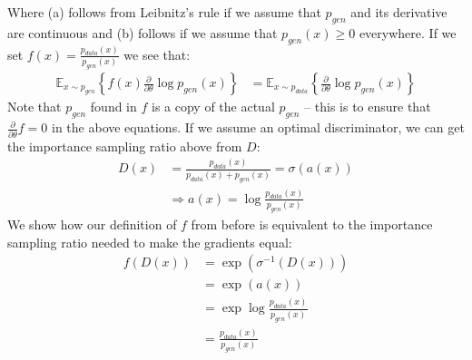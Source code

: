 \documentclass[paper=a4, fontsize=11pt]{scrartcl} %
\numberwithin{equation}{section} %
\numberwithin{figure}{section} %
\numberwithin{table}{section} %
\newcommand{\Ex}[2]{\mathbb{E}_{#1}\left\{#2\right\}}
\newcommand{\dP}[2]{\frac{\partial #1}{\partial #2}}
\begin{document}
Where (a) follows from Leibnitz's rule if we assume that $p_{gen}$ and its derivative are continuous and (b) follows if we assume that $p_{gen}(x) \ge 0$ everywhere. If we set $f(x)=\frac{p_{data}(x)}{p_{gen}(x)}$ we see that:
\begin{align*}
\Ex{x\sim p_{gen}}{f(x) \dP{}{\theta}\log p_{gen}(x)} &= \Ex{x\sim p_{data}}{\dP{}{\theta}\log p_{gen}(x)}
\end{align*}
Note that $p_{gen}$ found in $f$ is a copy of the actual $p_{gen}$ -- this is to ensure that $\dP{}{\theta}f = 0$ in the above equations. If we assume an optimal discriminator, we can get the importance sampling ratio above from $D$:
\begin{align*}
D(x) &= \frac{p_{data}(x)}{p_{data}(x)+p_{gen}(x)} = \sigma(a(x))\\
&\Rightarrow a(x) = \log\frac{p_{data}(x)}{p_{gen}(x)}
\end{align*}
We show how our definition of $f$ from before is equivalent to the importance sampling ratio needed to make the gradients equal:
\begin{align*}
f(D(x)) &= \exp( \sigma^{-1}(D(x)) ) \\
&= \exp( a(x) ) \\
&= \exp\log\frac{p_{data}(x)}{p_{gen}(x)}\\
&= \frac{p_{data}(x)}{p_{gen}(x)}
\end{align*}


\newpage



\end{document}
